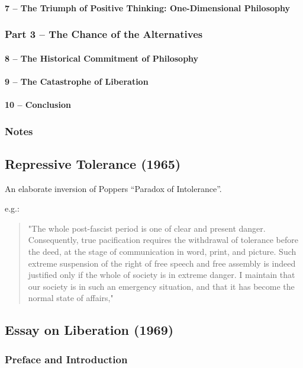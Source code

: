\documentclass[10pt,titlepage]{book}
\begin{document}
\paragraph{7 – The Triumph of Positive Thinking: One-Dimensional Philosophy}
\subsubsection{Part 3 – The Chance of the Alternatives}
\paragraph{8 – The Historical Commitment of Philosophy}
\paragraph{9 – The Catastrophe of Liberation}
\paragraph{10 – Conclusion}
\subsubsection{Notes}


\subsection{Repressive Tolerance (1965)\cite{marcuse-repressive}}

An elaborate inversion of Poppers ``Paradox of Intolerance''.

e.g.:

\begin{quotation}
"The whole post-fascist period is one of clear and present danger. Consequently, true pacification requires the withdrawal of tolerance before the deed, at the stage of communication in word, print, and picture. Such extreme suspension of the right of free speech and free assembly is indeed justified only if the whole of society is in extreme danger. I maintain that our society is in such an emergency situation, and that it has become the normal state of affairs,"
\end{quotation}

  
\subsection{Essay on Liberation (1969)\cite{marcuse-liberation}}

\subsubsection{Preface and Introduction}
\end{document}
